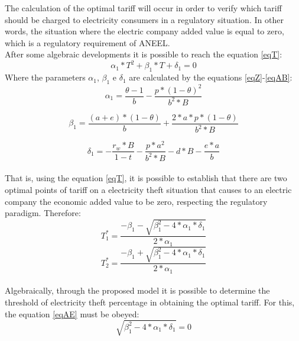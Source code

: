 \documentclass[preprint,12pt]{elsarticle}
\begin{document}
The calculation of the optimal tariff will occur in order to verify which tariff should be charged to electricity consumers in a regulatory situation. In other words, the situation where the electric company added value is equal to zero, which is a regulatory requirement of ANEEL.\\
After some algebraic developments it is possible to reach the equation \ref{eqT}:
\begin{equation}
\alpha_1 *T^2 +\beta_1 * T + \delta_1 = 0
\label{eqT}
\end{equation}
Where the parameters $\alpha_1$, $\beta_1$ e $\delta_1$ are calculated by the equations \ref{eqZ}-\ref{eqAB}:
\begin{equation}
\alpha_1 = \frac{\theta - 1}{b} - \frac{p*(1-\theta)^2}{b^2*B}
\label{eqZ}
\end{equation}

\begin{equation}
\beta_1 = \frac{(a+e)*(1-\theta)}{b}+\frac{2*a*p*(1-\theta)}{b^2*B}
\label{eqAA}
\end{equation}

\begin{equation}
\delta_1 = -\frac{r_w *B}{1-t}- \frac{p*a^2}{b^2*B}-d*B- \frac{e*a}{b}
\label{eqAB}
\end{equation}\\
That is, using the equation \ref{eqT}, it is possible to establish that there are two optimal points of tariff on a electricity theft situation that causes to an electric company the economic added value to be zero, respecting the regulatory paradigm.
Therefore:\\
\begin{equation}
T_1^* =  \frac{-\beta_1 -\sqrt{\beta_1^2 - 4*\alpha_1*\delta_1}}{2*\alpha_1}
\label{eqAC}
\end{equation}
\begin{equation}
T_2^* =  \frac{-\beta_1 +\sqrt{\beta_1^2 - 4*\alpha_1*\delta_1}}{2*\alpha_1}
\label{eqAD}
\end{equation}\\

Algebraically, through the proposed model it is possible to determine the threshold of electricity theft percentage in obtaining the optimal tariff. For this, the equation \ref{eqAE} must be obeyed:\\ 

\begin{equation}
\sqrt{\beta_1^2 - 4*\alpha_1*\delta_1}=0
\label{eqAE}
\end{equation}\\
\end{document}
